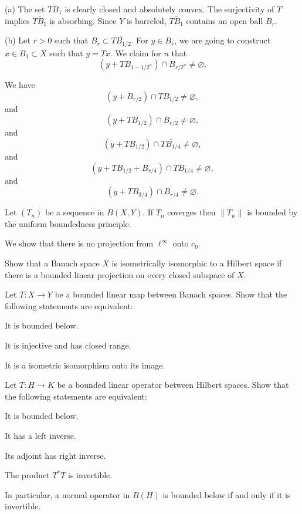 \documentclass{../note}
\begin{document}
\begin{pf}
(a)
The set $\bar{TB_1}$ is clearly closed and absolutely convex.
The surjectivity of $T$ implies $\bar{TB_1}$ is absorbing.
Since $Y$ is barreled, $\bar{TB_1}$ contains an open ball $B_r$.

(b)
Let $r>0$ such that $B_r\subset\bar{TB_{1/2}}$.
For $y\in B_r$, we are going to construct $x\in B_1\subset X$ such that $y=Tx$.
We claim for $n$ that
\[(y+TB_{1-1/2^n})\cap B_{r/2^n}\ne\varnothing.\]

We have
\[(y+B_{r/2})\cap TB_{1/2}\ne\varnothing,\]
and
\[(y+TB_{1/2})\cap B_{r/2}\ne\varnothing,\]
and
\[(y+TB_{1/2})\cap\bar{TB_{1/4}}\ne\varnothing,\]
and
\[(y+TB_{1/2}+B_{r/4})\cap TB_{1/4}\ne\varnothing,\]
and
\[(y+TB_{3/4})\cap B_{r/4}\ne\varnothing.\]


\end{pf}


\begin{prb}
Let $(T_n)$ be a sequence in $B(X,Y)$.
If $T_n$ coverges then $\|T_n\|$ is bounded by the uniform boundedness principle.
\end{prb}


\begin{prb}
We show that there is no projection from $\ell^\infty$ onto $c_0$.
\begin{parts}
\item
Show that a Banach space $X$ is isometrically isomorphic to a Hilbert space if there is a bounded linear projection on every closed subspace of $X$.
\end{parts}
\end{prb}





\begin{prb}
Let $T:X\to Y$ be a bounded linear map between Banach spaces.
Show that the following statements are equivalent:
\begin{parts}
\item It is bounded below.
\item It is injective and has closed range.
\item It is a isometric isomorphism onto its image.
\end{parts}
\end{prb}


\begin{prb}
Let $T:H\to K$ be a bounded linear operator between Hilbert spaces.
Show that the following statements are equivalent:
\begin{parts}
\item It is bounded below.
\item It has a left inverse.
\item Its adjoint has right inverse.
\item The product $T^*T$ is invertible.
\end{parts}
In particular, a normal operator in $B(H)$ is bounded below if and only if it is invertible.
\end{prb}
\end{document}
